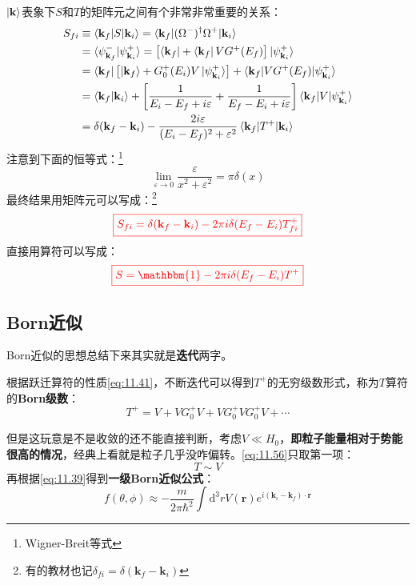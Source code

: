 \documentclass[a4paper,zihao=-4,linespread=1]{ctexrep}
\begin{document}
	$\ket{\mathbf{k}}$表象下$S$和$T$的矩阵元之间有个非常非常重要的关系：
	\begin{equation}
		\begin{aligned}
			S_{fi}&\equiv\braket{\mathbf{k}_f|S|\mathbf{k}_i}=\braket{\mathbf{k}_f| (\Omega^-)^\dagger\Omega^+|\mathbf{k}_i}\\
			&=\braket{\psi^-_{\mathbf{k}_f}|\psi^+_{\mathbf{k}_i}}=\left[\bra{\mathbf{k}_f}+\bra{\mathbf{k}_f} V G^+(E_f)\right]\ket{\psi^+_{\mathbf{k}_i}}\\
			&=\bra{\mathbf{k}_f}\left[\ket{\mathbf{k}_f}+G_0^+(E_i)V\ket{\psi^+_{\mathbf{k}_i}}\right]+\braket{\mathbf{k}_f|VG^+(E_f)|\psi^+_{\mathbf{k}_i}}\\
			&=\braket{\mathbf{k}_f|\mathbf{k}_i}+\left[\frac{1}{E_i-E_f+i\varepsilon}+\frac{1}{E_f-E_i+i\varepsilon}\right]\braket{\mathbf{k}_f|V|\psi^+_{\mathbf{k}_i}}\\
			&=\delta({\mathbf{k}_f-\mathbf{k}_i})-\frac{2i\varepsilon}{(E_i-E_f)^2+\varepsilon^2}\braket{\mathbf{k}_f|T^+|{\mathbf{k}_i}}
		\end{aligned}
	\end{equation}	
	注意到下面的恒等式：\footnote{Wigner-Breit等式}
	\begin{equation}
		\lim_{\varepsilon\to 0}\frac{\varepsilon}{x^2+\varepsilon^2}=\pi\delta(x)
	\end{equation}
	最终结果用矩阵元可以写成：\footnote{有的教材也记$\delta_{fi}=\delta({\mathbf{k}_f-\mathbf{k}_i})$}
	\begin{equation}
		{\color{red}
		\boxed{
		S_{fi}=\delta({\mathbf{k}_f-\mathbf{k}_i})-2\pi i\delta(E_f-E_i) T^+_{fi}
	}}
	\end{equation}
	直接用算符可以写成：
	\begin{equation}
		\label{eq:11.55}
		{\color{red}
			\boxed{
				S=\mathbbm{1}-2\pi i\delta(E_f-E_i) T^+
		}}
	\end{equation}
	\subsection{Born近似}
	Born近似的思想总结下来其实就是\textbf{迭代}两字。
	
	根据跃迁算符的性质\ref{eq:11.41}，不断迭代可以得到$T^+$的无穷级数形式，称为$T$算符的\textbf{Born级数}：
	\begin{equation}
		\label{eq:11.56}
		T^+=V+VG_0^+V+VG_0^+VG_0^+V+\cdots
	\end{equation}

	但是这玩意是不是收敛的还不能直接判断，考虑$V\ll H_0$，\textbf{即粒子能量相对于势能很高的情况}，经典上看就是粒子几乎没咋偏转。\ref{eq:11.56}只取第一项：
	\[T\sim V\]
	再根据\ref{eq:11.39}得到\textbf{一级Born近似公式}：
	\begin{equation}
		\label{eq:11.57}
		\boxed{
		f(\theta,\phi)\approx -\frac{m}{2\pi\hbar^2}\int\mathrm{d}^3r V(\mathbf{r})e^{i\left(\mathbf{k}_i-\mathbf{k}_f\right)\cdot \mathbf{r}}}
	\end{equation}
\end{document}
